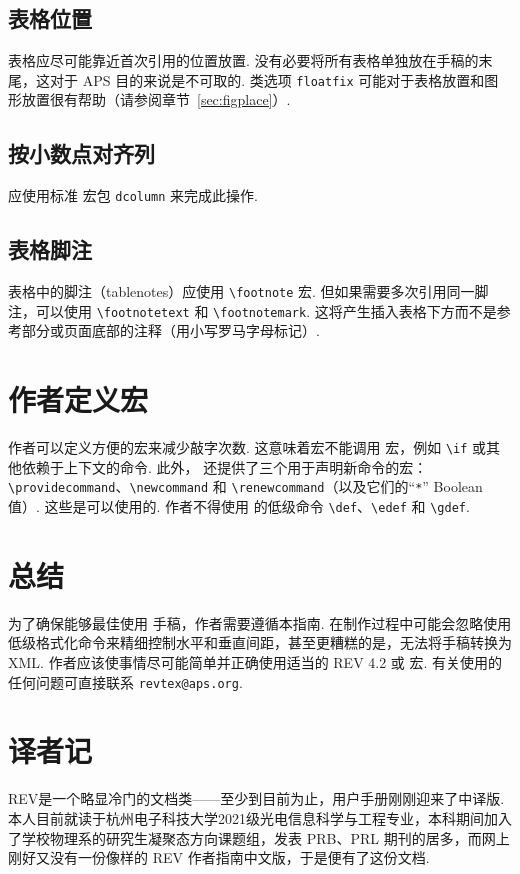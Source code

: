 \documentclass[twocolumn, amssymb, bibnotes, aps, prd, 10pt]{revtex4-2}
\newcommand{\revtex}{REV\hologo{TeX}}
\newcommand{\classoption}[1]{\texttt{#1}}
\newcommand{\macro}[1]{\texttt{\textbackslash#1}}
\newcommand{\m}[1]{\macro{#1}}
\begin{document}
\subsection{表格位置}
表格应尽可能靠近首次引用的位置放置. 没有必要将所有表格单独放在手稿的末尾，这对于 APS 目的来说是不可取的. 类选项 \classoption{floatfix} 可能对于表格放置和图形放置很有帮助（请参阅章节~\ref{sec:figplace}）.

\subsection{按小数点对齐列}
应使用标准 {} 宏包 \classoption{dcolumn} 来完成此操作.

\subsection{表格脚注}
\label{sec:tablenotes}
表格中的脚注（tablenotes）应使用 \m{footnote} 宏. 但如果需要多次引用同一脚注，可以使用 \m{footnotetext} 和 \m{footnotemark}. 这将产生插入表格下方而不是参考部分或页面底部的注释（用小写罗马字母标记）.

\section{作者定义宏}
作者可以定义方便的宏来减少敲字次数. 这意味着宏不能调用 {} 宏，例如 \m{if} 或其他依赖于上下文的命令. 此外，{} 还提供了三个用于声明新命令的宏：\m{providecommand}、\m{newcommand} 和 \m{renewcommand}（以及它们的``\verb+*+'' Boolean 值）. 这些是可以使用的. 作者不得使用 {} 的低级命令 \m{def}、\m{edef} 和 \m{gdef}.

\section{总结}
为了确保能够最佳使用 {} 手稿，作者需要遵循本指南. 在制作过程中可能会忽略使用低级格式化命令来精细控制水平和垂直间距，甚至更糟糕的是，无法将手稿转换为 XML. 作者应该使事情尽可能简单并正确使用适当的 {\revtex} 4.2 或 {} 宏. 有关使用的任何问题可直接联系 \texttt{revtex@aps.org}.

\appendix\onecolumngrid

\section*{译者记}

{\revtex}是一个略显冷门的文档类——至少到目前为止，用户手册刚刚迎来了中译版. 本人目前就读于杭州电子科技大学2021级光电信息科学与工程专业，本科期间加入了学校物理系的研究生凝聚态方向课题组，发表 PRB、PRL 期刊的居多，而网上刚好又没有一份像样的 {\revtex} 作者指南中文版，于是便有了这份文档.
\end{document}
